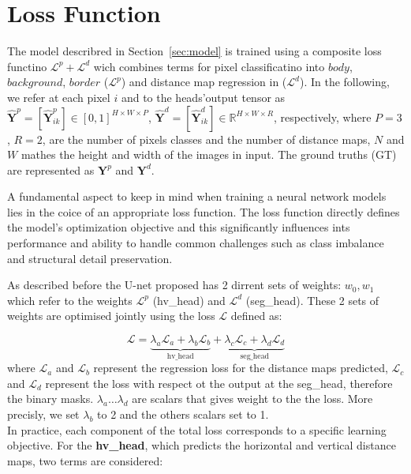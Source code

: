 \documentclass[target=bach,aauheader=,style=]{thud}
\begin{document}
\section{Loss Function}
The model describred in Section~\ref{sec:model} is trained using a composite loss functino $\mathcal{L}^p+\mathcal{L}^d$ wich combines terms for pixel classificatino into $body$, $background$, $border$ ($\mathcal{L}^p$) and distance map regression in ($\mathcal{L}^d$).
In the following, we refer at each pixel $i$ and to the heads'output tensor as $\widehat{\mathbf{Y}}^p=[\widehat{\mathbf{Y}}^p_{ik}]\in [0,1]^{H\times W\times P}$, $\widehat{\mathbf{Y}}^d=[\widehat{\mathbf{Y}}^d_{ik}]\in \mathbb{R}^{H\times W\times R}$, respectively, where $P = 3$, $R = 2$, are the number of pixels classes and the number of distance maps, $N$ and $W$ mathes the height and width of the images in input. The ground truths (GT) are represented as $\mathbf{Y}^p$ and $\mathbf{Y}^d$.

A fundamental aspect to keep in mind when training a neural network models lies in the coice of an appropriate loss function. The loss function directly defines the model's optimization objective and this significantly influences ints performance and ability to handle common challenges such as class imbalance and structural detail preservation.

As described before the U-net proposed has 2 dirrent sets of weights: $w_0, w_1$ which refer to the weights $\mathcal{L}^p$ (hv\_head) and $\mathcal{L}^d$ (seg\_head). These 2 sets of weights are optimised jointly using the loss $\mathcal{L}$ defined as:

\begin{equation}
\mathcal{L} =
\underbrace{\lambda_a \mathcal{L}_a + \lambda_b \mathcal{L}_b}_{\text{hv\_head}} +
\underbrace{\lambda_c \mathcal{L}_c + \lambda_d \mathcal{L}_d}_{\text{seg\_head}}
\end{equation}
where $\mathcal{L}_a$ and $\mathcal{L}_b$ represent the regression loss for the distance maps predicted, $\mathcal{L}_c$ and $\mathcal{L}_d$ represent the loss with respect ot the output at the seg\_head, therefore the binary masks. $\lambda_a\dots\lambda_d$ are scalars that gives weight to the the loss. More precisly, we set $\lambda_b$ to 2 and the others scalars set to 1. \\

In practice, each component of the total loss corresponds to a specific learning objective. 
For the \textbf{hv\_head}, which predicts the horizontal and vertical distance maps, two terms are considered: 
\end{document}
